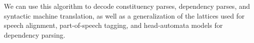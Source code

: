 We can use this algorithm to decode constituency parses, dependency parses, and syntactic machine translation, as well as a generalization of the lattices used for speech alignment, part-of-speech tagging, and head-automata models for dependency parsing.


